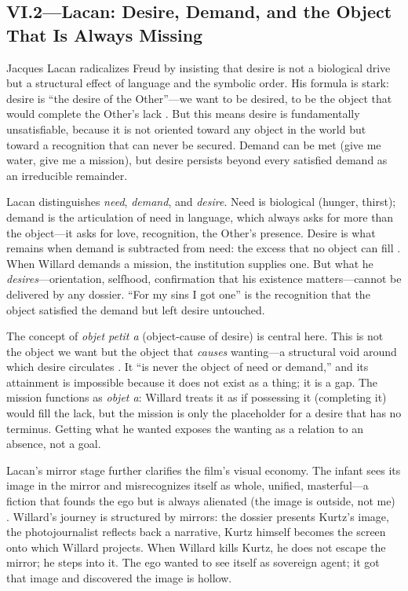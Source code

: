 \subsection*{VI.2—Lacan: Desire, Demand, and the Object That Is Always Missing}
\label{ssec:vi-lacan}

Jacques Lacan radicalizes Freud by insisting that desire is not a biological drive but a
structural effect of language and the symbolic order. His formula is stark: desire is ``the
desire of the Other''---we want to be desired, to be the object that would complete the
Other's lack \parencite{LacanEcrits2006}. But this means desire is fundamentally
unsatisfiable, because it is not oriented toward any object in the world but toward a
recognition that can never be secured. Demand can be met (give me water, give me a mission),
but desire persists beyond every satisfied demand as an irreducible remainder.

Lacan distinguishes \emph{need}, \emph{demand}, and \emph{desire}. Need is biological (hunger,
thirst); demand is the articulation of need in language, which always asks for more than the
object---it asks for love, recognition, the Other's presence. Desire is what remains when
demand is subtracted from need: the excess that no object can fill
\parencite{LacanEcrits2006}. When Willard demands a mission, the institution supplies one. But
what he \emph{desires}---orientation, selfhood, confirmation that his existence
matters---cannot be delivered by any dossier. ``For my sins I got one'' is the recognition
that the object satisfied the demand but left desire untouched.

The concept of \emph{objet petit a} (object-cause of desire) is central here. This is not the
object we want but the object that \emph{causes} wanting---a structural void around which
desire circulates \parencite[p.~103]{LacanSeminarXI1991}. It ``is never the object of need or
demand,'' and its attainment is impossible because it does not exist as a thing; it is a gap.
The mission functions as \emph{objet a}: Willard treats it as if possessing it (completing it)
would fill the lack, but the mission is only the placeholder for a desire that has no
terminus. Getting what he wanted exposes the wanting as a relation to an absence, not a goal.

Lacan's mirror stage further clarifies the film's visual economy. The infant sees its image in
the mirror and misrecognizes itself as whole, unified, masterful---a fiction that founds the
ego but is always alienated (the image is outside, not me) \parencite{LacanEcrits2006}.
Willard's journey is structured by mirrors: the dossier presents Kurtz's image, the
photojournalist reflects back a narrative, Kurtz himself becomes the screen onto which Willard
projects. When Willard kills Kurtz, he does not escape the mirror; he steps into it. The ego
wanted to see itself as sovereign agent; it got that image and discovered the image is hollow.

